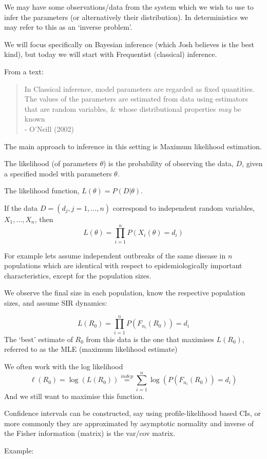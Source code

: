 \documentclass{/home/janmebows/Documents/LatexTemplates/myassignment}
\begin{document}
We may have some observations/data from the system which we wish to use to infer the parameters (or alternatively their distribution). In deterministics we may refer to this as an `inverse problem'.

We will focus specifically on Bayesian inference (which Josh believes is the best kind), but today we will start with Frequentist (classical) inference. 

From a text:

\begin{verse}
\noindent
{\centering
In Classical inference, model parameters are regarded as fixed quantities. The values of the parameters are estimated from data using estimators that are random variables, \& whose distributional properties \textit{may} be known}\\
- O'Neill (2002)
\end{verse}
The main approach to inference in this setting is Maximum likelihood estimation. 

The likelihood (of parameters $\theta$) is the probability of observing the data, $D$, given a specified model with parameters $\theta$.

The likelihood function, $L(\theta) = P(D|\theta)$.

If the data $D = (d_j,j=1,\ldots,n)$ correspond to independent random variables, $X_1,\ldots,X_n$, then
\[L(\theta) = \prod_{i=1}^n P(X_i(\theta) = d_i)\]

For example lets assume independent outbreaks of the same disease in $n$ populations which are identical with respect to epidemiologically important characteristics, except for the population sizes.

We observe the final size in each population, know the respective population sizes, and assume SIR dynamics:

\[L(R_0) = \prod_{i=1}^n P(F_{n_i}(R_0)) = d_i\]
The `best' estimate of $R_0$ from this data is the one that maximises $L(R_0)$, referred to as the MLE (maximum likelihood estimate)

We often work with the log likelihood
\[\ell(R_0) = \log(L(R_0)) \stackrel{indep}= \sum_{i=1}^n \log \left(P(F_{n_i}(R_0)) = d_i\right)\]
And we still want to maximise this function.


Confidence intervals can be constructed, say using profile-likelihood based CIs, or more commonly they are approximated by asymptotic normality and inverse of the Fisher information (matrix) is the var/cov matrix.


Example:
\end{document}

